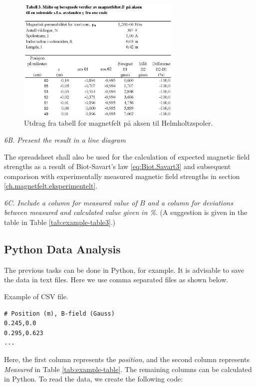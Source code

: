 \documentclass[../Elmag-labhefte-2020.tex]{subfiles}
\begin{document}
\begin{figure}[ht]
\RawFloats
    \begin{center}
    \includegraphics[width=0.7\textwidth]{fig/magnetfelt-tab3.eps}
    \end{center}
    \caption{%
        Utdrag fra tabell for magnetfelt på aksen til Helmholtzspoler.
    }
    \label{magnetfelt.tab3}
\end{figure}

\emph{ 6B. Present the result in a line diagram}

The spreadsheet shall also be used for the calculation of expected magnetic field strengths as a result of Biot-Savart's law \eqref{eq:Biot.Savart3} and subsequent comparison with experimentally measured magnetic field strengths in section \ref{ch.magnetfelt.eksperimentelt}.

\emph{ 6C. Include a column for measured value of $B$ and a column for deviations between measured and calculated value given in \si{\percent}}. (A suggestion is given in the table in Table \ref{tab:example-table3}.)

\subsection{Python Data Analysis}
The previous tasks can be done in Python, for example. It is advisable to save the data in text files. Here we use comma separated files as shown below.
\begin{marginlisting}
  \caption{Example of CSV file.}
\begin{verbatim}
# Position (m), B-field (Gauss)
0.245,0.0
0.295,0.623
...
\end{verbatim}
\end{marginlisting}
Here, the first column represents the \emph{position}, and the second column represents \emph{Measured} in Table \ref{tab:example-table}. The remaining columns can be calculated in Python. To read the data, we create the following code:
\end{document}
